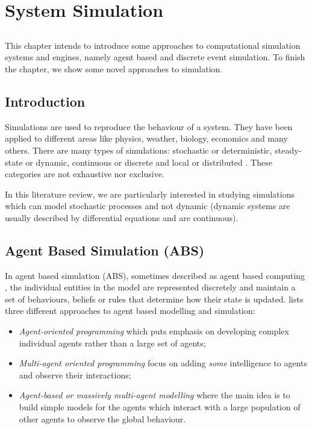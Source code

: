 \chapter{System Simulation} \label{chap:simulation}

\section*{}

This chapter intends to introduce some approaches to computational simulation 
systems and engines, namely agent based and discrete event simulation. To 
finish the chapter, we show some novel approaches to simulation.

\section{Introduction}

Simulations are used to reproduce the behaviour of a system. They have been 
applied to different areas like physics, weather, biology, economics and many 
others. There are many types of simulations: stochastic or deterministic, 
steady-state or dynamic, continuous or discrete and local or distributed 
\cite{WKSimulation}. These categories are not exhaustive nor exclusive.

In this literature review, we are particularly interested in studying 
simulations which can model stochastic processes and not dynamic (dynamic 
systems are usually described by differential equations and are continuous).

\section{Agent Based Simulation (ABS)}

In agent based simulation (ABS), sometimes described as agent based computing 
\cite{wooldridge1998agent, jennings1999agent}, the individual entities in the 
model are represented discretely and maintain a set of behaviours, beliefs or 
rules that determine how their state is updated. \cite{Niazi2011} lists three 
different approaches to agent based modelling and simulation:

\begin{itemize}
    \item \emph{Agent-oriented programming} which puts emphasis on developing 
    complex individual agents rather than a large set of agents;
    \item \emph{Multi-agent oriented programming} focus on adding \emph{some} 
    intelligence to agents and observe their interactions;
    \item \emph{Agent-based or massively multi-agent modelling} where the main 
    idea is to build simple models for the agents which interact with a large 
    population of other agents to observe the global behaviour.
\end{itemize}

